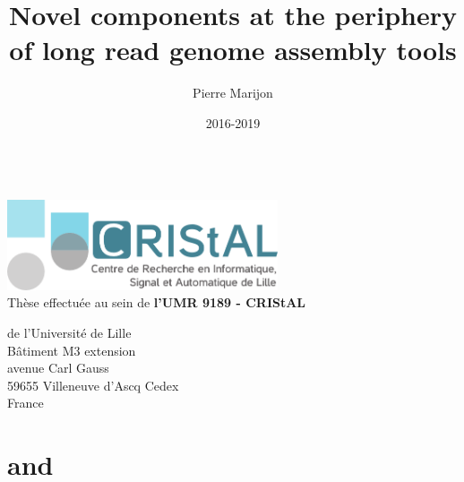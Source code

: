\documentclass{thesis}
\title{Novel components at the periphery of long read genome assembly tools} %
\author{Pierre Marijon}
\date{2016-2019}
\newcommand{\onlyinsubfile}[1]{#1}
\newcommand{\notinsubfile}[1]{}
\begin{document}
\renewcommand{\onlyinsubfile}[1]{}
\renewcommand{\notinsubfile}[1]{#1}

\maketitle
\clearpage

\listoftodos

\begin{center}
~\vspace*{\fill}\\
\thispagestyle{plain}
\includegraphics[width=0.6\textwidth]{assets/images/logo_cristal}\vspace{0.5cm}\\
Thèse effectuée au sein de \textbf{l'UMR 9189 - CRIStAL}\par 
 de l'Université de Lille\\
Bâtiment M3 extension\\
avenue Carl Gauss\\
59655 Villeneuve d'Ascq Cedex\\
France
\vspace*{\fill}
\clearpage
\end{center}

\frontmatter



\tableofcontents

\mainmatter













\notinsubfile{


}

\appendix

\chapter{\knot}


\chapter{\yacrd and \fpa}


\newpage
\backmatter

\end{document}
